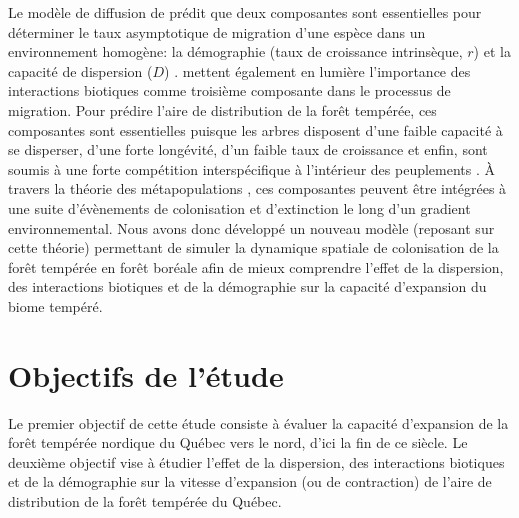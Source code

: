 Le modèle de diffusion de \citet{SKELLAM01061951} prédit que deux composantes sont essentielles pour
déterminer le taux asymptotique de migration d'une espèce dans un environnement homogène: la
démographie (taux de croissance intrinsèque, $r$) et la capacité de dispersion ($D$) .
\citet{Svenning2014a} mettent également en lumière l'importance des interactions biotiques comme
troisième composante dans le processus de migration. Pour prédire l'aire de distribution de la forêt
tempérée, ces composantes sont essentielles puisque les arbres disposent d'une
faible capacité à se disperser, d'une forte longévité, d'un faible taux de croissance et enfin, sont
soumis à une forte compétition interspécifique à l'intérieur des peuplements
\citep{Renwick2014,Vanderwel2014}. À travers la théorie des métapopulations
\citep{Levins1969,Holt2000,Holt2005}, ces composantes peuvent être intégrées à une suite
d'évènements de colonisation et d'extinction le long d'un gradient environnemental. Nous avons donc
développé un nouveau modèle (reposant sur cette théorie) permettant de simuler la dynamique spatiale
de colonisation de la forêt tempérée en forêt boréale afin de mieux comprendre l'effet de la
dispersion, des interactions biotiques et de la démographie sur la capacité d'expansion du biome
tempéré.


\section*{Objectifs de l'étude}

Le premier objectif de cette étude consiste à évaluer la capacité d'expansion de la forêt tempérée nordique du Québec vers le nord, d'ici la fin de ce siècle. Le deuxième objectif vise à étudier l'effet de la dispersion, des interactions biotiques et de la démographie sur la vitesse
d'expansion (ou de contraction) de l'aire de distribution de la forêt tempérée du Québec.

